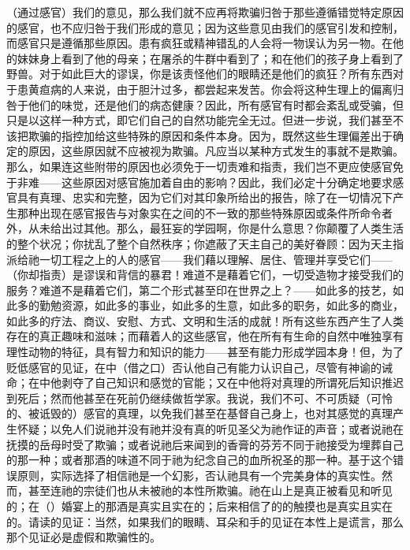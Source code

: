 （通过感官）我们的意见，那么我们就不应再将欺骗归咎于那些遵循错觉特定原因的感官，也不应归咎于我们形成的意见；因为这些意见由我们的感官引发和控制，而感官只是遵循那些原因。患有疯狂或精神错乱的人会将一物误认为另一物。在他的妹妹身上看到了他的母亲；在屠杀的牛群中看到了；和在他们的孩子身上看到了野兽。对于如此巨大的谬误，你是该责怪他们的眼睛还是他们的疯狂？所有东西对于患黄疸病的人来说，由于胆汁过多，都尝起来发苦。你会将这种生理上的偏离归咎于他们的味觉，还是他们的病态健康？因此，所有感官有时都会紊乱或受骗，但只是以这样一种方式，即它们自己的自然功能完全无过。但进一步说，我们甚至不该把欺骗的指控加给这些特殊的原因和条件本身。因为，既然这些生理偏差出于确定的原因，这些原因就不应被视为欺骗。凡应当以某种方式发生的事就不是欺骗。那么，如果连这些附带的原因也必须免于一切责难和指责，我们岂不更应使感官免于非难——这些原因对感官施加着自由的影响？因此，我们必定十分确定地要求感官具有真理、忠实和完整，因为它们对其印象所给出的报告，除了在一切情况下产生那种出现在感官报告与对象实在之间的不一致的那些特殊原因或条件所命令者外，从未给出过其他。那么，最狂妄的学园啊，你是什么意思？你颠覆了人类生活的整个状况；你扰乱了整个自然秩序；你遮蔽了天主自己的美好眷顾：因为天主指派给祂一切工程之上的人的感官——我们藉以理解、居住、管理并享受它们——（你却指责）是谬误和背信的暴君！难道不是藉着它们，一切受造物才接受我们的服务？难道不是藉着它们，第二个形式甚至印在世界之上？——如此多的技艺，如此多的勤勉资源，如此多的事业，如此多的生意，如此多的职务，如此多的商业，如此多的疗法、商议、安慰、方式、文明和生活的成就！所有这些东西产生了人类存在的真正趣味和滋味；而藉着人的这些感官，他在所有有生命的自然中唯独享有理性动物的特征，具有智力和知识的能力——甚至有能力形成学园本身！但，为了贬低感官的见证，在中（借之口）否认他自己有能力认识自己，尽管有神谕的诫命；在中他剥夺了自己知识和感觉的官能；又在中他将对真理的所谓死后知识推迟到死后；然而他甚至在死前仍继续做哲学家。我说，我们不可、不可质疑（可怜的、被诋毁的）感官的真理，以免我们甚至在基督自己身上，也对其感觉的真理产生怀疑；以免人们说祂并没有祂并没有真的听见圣父为祂作证的声音；或者说祂在抚摸的岳母时受了欺骗；或者说祂后来闻到的香膏的芬芳不同于祂接受为埋葬自己的那一种；或者那酒的味道不同于祂为纪念自己的血所祝圣的那一种。基于这个错误原则，实际选择了相信祂是一个幻影，否认祂具有一个完美身体的真实性。然而，甚至连祂的宗徒们也从未被祂的本性所欺骗。祂在山上是真正被看见和听见的；在（）婚宴上的那酒是真实且实在的；后来相信了的的触摸也是真实且实在的。请读的见证：当然，如果我们的眼睛、耳朵和手的见证在本性上是谎言，那么那个见证必是虚假和欺骗性的。\par

